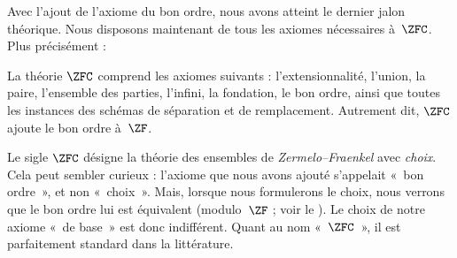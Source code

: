 \documentclass[../../../include/open-logic-section]{subfiles}
\begin{document}

Avec l'ajout de l'axiome du bon ordre, nous avons
atteint le dernier jalon théorique. Nous disposons
maintenant de tous les axiomes nécessaires à~$\ZFC$.
Plus précisément :

\begin{defn}
La théorie $\ZFC$ comprend les axiomes suivants :
l'extensionnalité, l'union, la paire, l'ensemble
des parties, l'infini, la fondation, le bon ordre,
ainsi que toutes les instances des schémas de
séparation et de remplacement. Autrement dit,
$\ZFC$ ajoute le bon ordre à~$\ZF$.
\end{defn}

Le sigle $\ZFC$ désigne la théorie des ensembles
de \emph{Zermelo--Fraenkel} avec \emph{choix}.
Cela peut sembler curieux : l'axiome que nous
avons ajouté s'appelait «~bon ordre~», et non
«~choix~». Mais, lorsque nous formulerons le
{choix}, nous verrons que le bon ordre lui est
équivalent (modulo~$\ZF$ ; voir le
).
Le choix de notre axiome «~de base~» est donc
indifférent. Quant au nom «~$\ZFC$~», il est
parfaitement standard dans la littérature.
\end{document}
